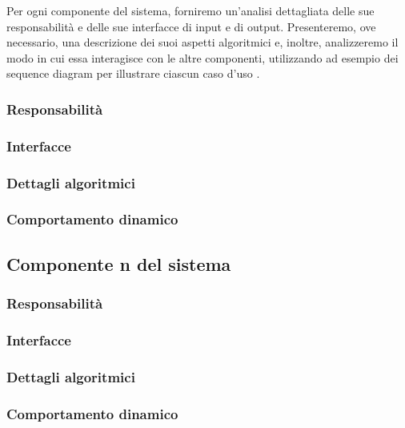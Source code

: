 Per ogni componente del sistema, forniremo un'analisi dettagliata delle sue responsabilità e delle sue interfacce di input e di output. Presenteremo, ove necessario, una descrizione dei suoi aspetti algoritmici e, inoltre, analizzeremo il modo in cui essa interagisce con le altre componenti, utilizzando ad esempio dei sequence diagram per illustrare ciascun caso d'uso \cite{harran2023design}.

\subsubsection{Responsabilità}

\subsubsection{Interfacce}

\subsubsection{Dettagli algoritmici}

\subsubsection{Comportamento dinamico}

\subsection{Componente n del sistema}

\subsubsection{Responsabilità}

\subsubsection{Interfacce}

\subsubsection{Dettagli algoritmici}

\subsubsection{Comportamento dinamico}

